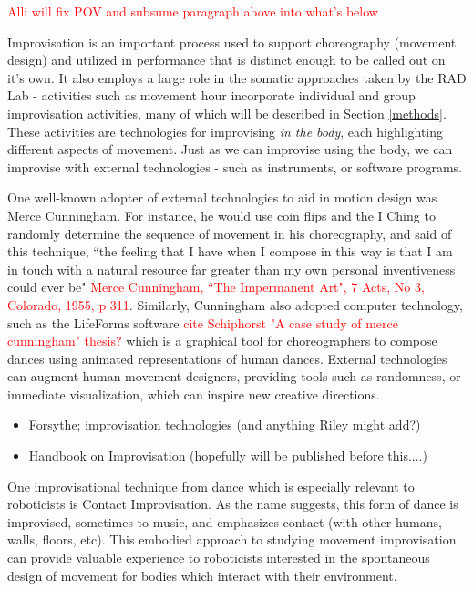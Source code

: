 \documentclass[arts,article,submit,moreauthors,pdftex,10pt,a4paper]{mdpi}
\begin{document}
\textcolor{red}{Alli will fix POV and subsume paragraph above into what's below}

Improvisation is an important process used to support choreography (movement
design) and utilized in performance that is distinct enough to be called out on
it's own. It also employs a large role in the somatic approaches taken by the
RAD Lab - activities such as movement hour incorporate individual and group
improvisation activities, many of which will be described in Section
\ref{methods}. These activities are technologies for improvising \textit{in the
body}, each highlighting different aspects of movement. Just as we can improvise
using the body, we can improvise with external technologies - such as
instruments, or software programs.

One well-known adopter of external technologies to aid in motion design was
Merce Cunningham. For instance, he would use coin flips and the I Ching to
randomly determine the sequence of movement in his choreography, and said of
this technique, ``the feeling that I have when I compose in this way is that I
am in touch with a natural resource far greater than my own personal
inventiveness could ever be" \textcolor{red}{Merce Cunningham, ``The Impermanent
Art", 7 Acts, No 3, Colorado, 1955, p 311}.
Similarly, Cunningham also adopted computer technology, such as the LifeForms
software \textcolor{red}{cite Schiphorst "A case study of merce cunningham"
thesis?} which is a graphical tool for choreographers to compose dances using
animated representations of human dances.
External technologies can augment human movement designers, providing tools such
as randomness, or immediate visualization, which can inspire new creative directions.

\begin{itemize}
\item Forsythe; improvisation technologies (and anything Riley might add?)
\item Handbook on Improvisation (hopefully will be published before this....)
\end{itemize}

One improvisational technique from dance which is especially relevant to
roboticists is Contact Improvisation. As the name suggests, this form of dance
is improvised, sometimes to music, and emphasizes contact (with other humans,
walls, floors, etc). This embodied approach to studying movement improvisation
can provide valuable experience to roboticists interested in the spontaneous
design of movement for bodies which interact with their environment.
\end{document}
